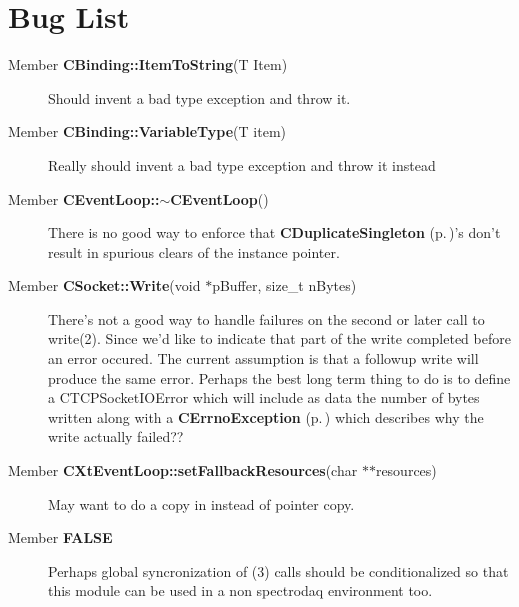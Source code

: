 \section{Bug List}\label{bug}
\begin{description}
\item[\label{_bug000005}
Member {\bf CBinding::Item\-To\-String}(T Item) ]
 Should invent a bad type exception and throw it. \end{description}


\begin{description}
\item[\label{_bug000004}
Member {\bf CBinding::Variable\-Type}(T item) ]
Really should invent a bad type exception and throw it instead\end{description}


\begin{description}
\item[\label{_bug000001}
Member {\bf CEvent\-Loop::$\sim$CEvent\-Loop}() ]
There is no good way to enforce that {\bf CDuplicate\-Singleton} {\rm (p.\,\pageref{classCDuplicateSingleton})}'s don't result in spurious clears of the instance pointer.\end{description}


\begin{description}
\item[\label{_bug000003}
Member {\bf CSocket::Write}(void $\ast$p\-Buffer, size\_\-t n\-Bytes) ]
There's not a good way to handle failures on the second or later call to write(2). Since we'd like to indicate that part of the write completed before an error occured. The current assumption is that a followup write will produce the same error. Perhaps the best long term thing to do is to define a CTCPSocket\-IOError which will include as data the number of bytes written along with a {\bf CErrno\-Exception} {\rm (p.\,\pageref{classCErrnoException})} which describes why the write actually failed??\end{description}


\begin{description}
\item[\label{_bug000006}
Member {\bf CXt\-Event\-Loop::set\-Fallback\-Resources}(char $\ast$$\ast$resources) ]
 May want to do a copy in instead of pointer copy.\end{description}


\begin{description}
\item[\label{_bug000002}
Member {\bf FALSE} ]
 Perhaps global syncronization of (3) calls should be conditionalized so that this module can be used in a non spectrodaq environment too. \end{description}
 